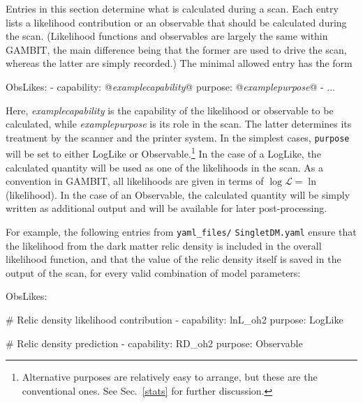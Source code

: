 \documentclass[pdftex,twocolumn,epjc3_preprint,runningheads]{svjour3}
\renewcommand{\_}{\discretionary{\underscore}{}{\underscore}}
\newcommand\yaml[1]{{\lstset{style=yaml}\lstinline!#1!\lstset{style=cpp}}}
\newcommand\yamlvalue[1]{{\YAMLvaluestyle\ttfamily#1}}
\newcommand\term[1]{{\lstset{style=terminal}\lstinline!#1!\lstset{style=cpp}}}
\newcommand\YAMLvaluestyle{\footnotesize\color{blue}\mdseries}
\newcommand{\metavarf}[1]{\textit{\color{darkgreen}\footnotesize\textrm{#1}}}
\newcommand{\metavar}{\metavarf}
\newcommand{\gambit}{\textsf{GAMBIT}\xspace}
\newcommand{\GB}{\gambit}
\begin{document}
Entries in this section determine what is calculated during a scan.  Each
entry lists a likelihood contribution or an observable that should be calculated
during the scan. (Likelihood functions and observables are largely the same
within \GB, the main difference being that the former are used to drive the scan,
whereas the latter are simply recorded.)  The minimal allowed entry has the form
%
\begin{lstyaml}
ObsLikes:
  - capability: @\metavar{example\_capability}@
    purpose: @\metavar{example\_purpose}@
  - ...
\end{lstyaml}
%
Here, \metavar{example\_capability} is the capability of the likelihood or
observable to be calculated, while \metavar{example\_purpose} is its role in
the scan.  The latter determines its treatment by the scanner and the printer system.  In
the simplest cases, \yaml{purpose} will be set to either
\yamlvalue{LogLike} or \yamlvalue{Observable}.\footnote{Alternative purposes
are relatively easy to arrange, but these are the conventional ones.  See Sec.\
\ref{stats} for further discussion.} In the case of a \yamlvalue{LogLike}, the
calculated quantity will be used as one of the likelihoods in the scan.  As a convention in
\GB, all likelihoods are given in terms of $\log\mathcal{L} = \ln$(likelihood).
In the case of an \mbox{\yamlvalue{Observable},} the calculated quantity will
be simply written as additional output and will be available for
later post-processing.

For example, the following entries from \term{yaml_files/} \term{SingletDM.yaml} ensure that the
likelihood from the dark matter relic density is included in the overall likelihood
function, and that the value of the relic density itself is saved in the output of the scan, for
every valid combination of model parameters:
\begin{lstyaml}
ObsLikes:

  # Relic density likelihood contribution
  - capability: lnL_oh2
    purpose:    LogLike

  # Relic density prediction
  - capability: RD_oh2
    purpose:    Observable

\end{lstyaml}
\end{document}

